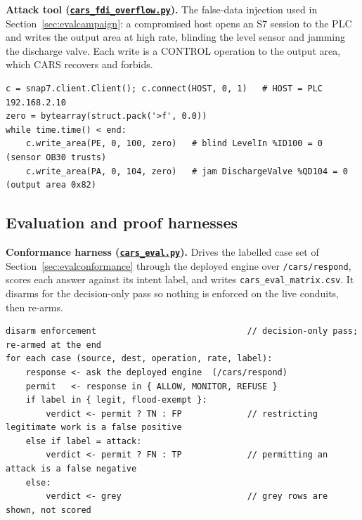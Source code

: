 \noindent \textbf{Attack tool (\href{\repourl/blob/main/06_Build/cars_fdi_overflow.py}{\texttt{cars\_fdi\_overflow.py}}).} The false-data injection used in Section~\ref{sec:evalcampaign}: a compromised host opens an S7 session to the PLC and writes the output area at high rate, blinding the level sensor and jamming the discharge valve. Each write is a CONTROL operation to the output area, which CARS recovers and forbids.

\begin{lstlisting}[style=carssrc,caption={The FDI overflow injection (writes to the S7 output area).},label={lst:fdi}]
c = snap7.client.Client(); c.connect(HOST, 0, 1)   # HOST = PLC 192.168.2.10
zero = bytearray(struct.pack('>f', 0.0))
while time.time() < end:
    c.write_area(PE, 0, 100, zero)   # blind LevelIn %ID100 = 0 (sensor OB30 trusts)
    c.write_area(PA, 0, 104, zero)   # jam DischargeValve %QD104 = 0 (output area 0x82)
\end{lstlisting}

\subsection*{Evaluation and proof harnesses}

\noindent \textbf{Conformance harness (\href{\repourl/blob/main/06_Build/cars_eval.py}{\texttt{cars\_eval.py}}).} Drives the labelled case set of Section~\ref{sec:evalconformance} through the deployed engine over \texttt{/cars/respond}, scores each answer against its intent label, and writes \texttt{cars\_eval\_matrix.csv}. It disarms for the decision-only pass so nothing is enforced on the live conduits, then re-arms.

\begin{lstlisting}[style=carspseudo,caption={Driving each case through the engine and scoring it against intent, in pseudocode.},label={lst:eval}]
disarm enforcement                              // decision-only pass; re-armed at the end
for each case (source, dest, operation, rate, label):
    response <- ask the deployed engine  (/cars/respond)
    permit   <- response in { ALLOW, MONITOR, REFUSE }
    if label in { legit, flood-exempt }:
        verdict <- permit ? TN : FP             // restricting legitimate work is a false positive
    else if label = attack:
        verdict <- permit ? FN : TP             // permitting an attack is a false negative
    else:
        verdict <- grey                         // grey rows are shown, not scored
\end{lstlisting}

